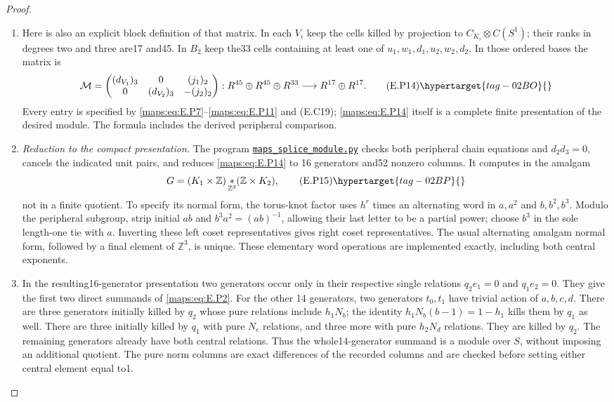 \begin{proof}
\begin{enumerate}[label={$\langle1\rangle$\arabic*.},leftmargin=*]
\item Here is also an explicit block definition of that
matrix. In each $V_i$ keep the cells killed by
projection to $C_{K_i}\otimes C(S^1)$; their ranks
in degrees two and three are17 and45. In $B_2$
keep the33 cells containing at least one of
$u_1,w_1,d_1,u_2,w_2,d_2$. In those ordered bases
the matrix is
\[
 \mathcal M=
 \begin{pmatrix}
 (d_{V_1})_3&0&(j_1)_2\\
 0&(d_{V_2})_3&-(j_2)_2
 \end{pmatrix}:
 R^{45}\oplus R^{45}\oplus R^{33}
             \longrightarrow R^{17}\oplus R^{17}.
 \tag{E.P14}\hypertarget{tag-02BO}{}\label{maps:eq:E.P14}
\]
Every entry is specified by \eqref{maps:eq:E.P7}--\eqref{maps:eq:E.P11} and
(E.C19); \eqref{maps:eq:E.P14} itself is a complete finite
presentation of the desired module. The formula
includes the derived peripheral comparison.


\item \emph{Reduction to the compact presentation.}
The program \href{https://github.com/KokunoYumeto/s6-complex-structure-workbench/blob/83d76022bcd442278b760db9ff438afceed6c6ea/pro_returns/S6_10_PAPERS_checkpoint_15_20261119T1045Z/S6_10_PAPERS/code/III/maps_splice_module.py}{\texttt{maps\_splice\_module.py}} checks both
peripheral chain equations and $d_2d_3=0$, cancels
the indicated unit pairs, and reduces \eqref{maps:eq:E.P14} to
16 generators and52 nonzero columns. It computes
in the amalgam
\[
 G=(K_1\times\mathbb Z)\mathop{*}_{\mathbb Z^3}
                                      (\mathbb Z\times K_2),
 \tag{E.P15}\hypertarget{tag-02BP}{}\label{maps:eq:E.P15}
\]
not in a finite quotient. To specify its normal
form, the torus-knot factor uses $h^r$ times an
alternating word in $a,a^2$ and $b,b^2,b^3$.
Modulo the peripheral subgroup, strip initial
$ab$ and $b^3a^2=(ab)^{-1}$, allowing their last
letter to be a partial power; choose $b^3$ in
the sole length-one tie with $a$. Inverting these
left coset representatives gives right coset
representatives. The usual alternating amalgam
normal form, followed by a final element of
$\mathbb Z^3$, is unique. These elementary word
operations are implemented exactly, including
both central exponents.

\item In the resulting16-generator presentation two
generators occur only in their respective single
relations $q_2e_1=0$ and $q_1e_2=0$. They give the
first two direct summands of \eqref{maps:eq:E.P2}. For the other
14 generators, two generators $t_0,t_1$ have
trivial action of $a,b,c,d$. There are three
generators initially killed by $q_2$ whose pure
relations include $h_1N_b$; the identity
$h_1N_b(b-1)=1-h_1$ kills them by $q_1$ as well.
There are three initially killed by $q_1$ with
pure $N_c$ relations, and three more with pure
$h_2N_d$ relations. They are killed by $q_2$.
The remaining generators already have both
central relations. Thus the whole14-generator
summand is a module over $S$, without imposing
an additional quotient. The pure norm columns
are exact differences of the recorded columns
and are checked before setting either central
element equal to1.


\end{enumerate}
\end{proof}

